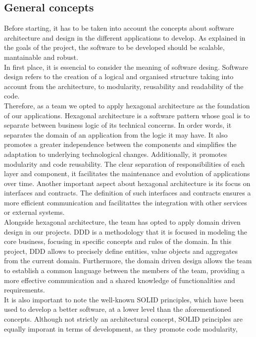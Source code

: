 \documentclass[../memory.tex]{subfiles}
\begin{document}
\subsection{General concepts}
Before starting, it has to be taken into account the concepts about software
architecture and design in the different applications to develop. As explained
in the goals of the project, the software to be developed should be scalable,
mantainable and robust.
\\[8pt]
In first place, it is essencial to consider the meaning of software desing.
Software design refers to the creation of a logical and organised structure
taking into account from the architecture, to modularity, reusability and
readability of the code.
\\[8pt]
Therefore, as a team we opted to apply hexagonal architecture as the foundation
of our applications. Hexagonal architecture is a software pattern whose goal is
to separate between business logic of its technical concerns. In order words, it
separates the domain of an application from the logic it may have. It also
promotes a greater independence between the components and simplifies the
adaptation to underlying technological changes. Additionally, it promotes
modularity and code reusability. The clear separation of responsibilities of
each layer and component, it facilitates the maintenance and evolution of
applications over time. Another important aspect about hexagonal architecture is
its focus on interfaces and contracts. The definition of such interfaces and
contracts ensures a more efficient communication and facilitattes the
integration with other services or external systems.
\\
Alongside hexagonal architecture, the team has opted to apply domain driven
design in our projects. DDD is a methodology that it is focused in modeling the
core business, focusing in specific concepts and rules of the domain. In this
project, DDD allows to precisely define entities, value objects and aggregates
from the current domain. Furthermore, the domain driven design allows the team
to establish a common language between the members of the team, providing a more
effective communication and a shared knowledge of functionalities and
requirements.
\\
It is also important to note the well-known SOLID principles, which have been
used to develop a better software, at a lower level than the aforementioned
concepts. Although not strictly an architectural concept, SOLID principles are
equally imporant in terms of development, as they promote code modularity,
\end{document}
